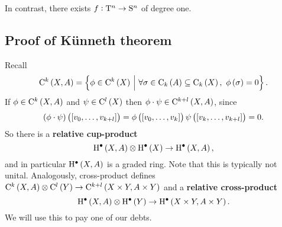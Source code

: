 \begin{exercise*}
In contrast, there exists $ f : \mathrm{T}^n \to \mathrm{S}^n $ of degree one.
\end{exercise*}

\pagebreak

\subsection{Proof of K\"unneth theorem}

Recall
$$ \C^k\br{X, A} = \cbr{\phi \in \C^k\br{X} \st \forall \sigma \in \C_k\br{A} \subseteq \C_k\br{X}, \ \phi\br{\sigma} = 0}. $$
If $ \phi \in \C^k\br{X, A} $ and $ \psi \in \C^l\br{X} $ then $ \phi \cdot \psi \in \C^{k + l}\br{X, A} $, since
$$ \br{\phi \cdot \psi}\br{\sbr{v_0, \dots, v_{k + l}}} = \phi\br{\sbr{v_0, \dots, v_k}}\psi\br{\sbr{v_k, \dots, v_{k + l}}} = 0. $$
So there is a \textbf{relative cup-product}
$$ \H^\bullet\br{X, A} \otimes \H^\bullet\br{X} \to \H^\bullet\br{X, A}, $$
and in particular $ \H^\bullet\br{X, A} $ is a graded ring. Note that this is typically not unital. Analogously, cross-product defines $ \C^k\br{X, A} \otimes \C^l\br{Y} \to \C^{k + l}\br{X \times Y, A \times Y} $ and a \textbf{relative cross-product}
$$ \H^\bullet\br{X, A} \otimes \H^\bullet\br{Y} \to \H^\bullet\br{X \times Y, A \times Y}. $$
We will use this to pay one of our debts.

